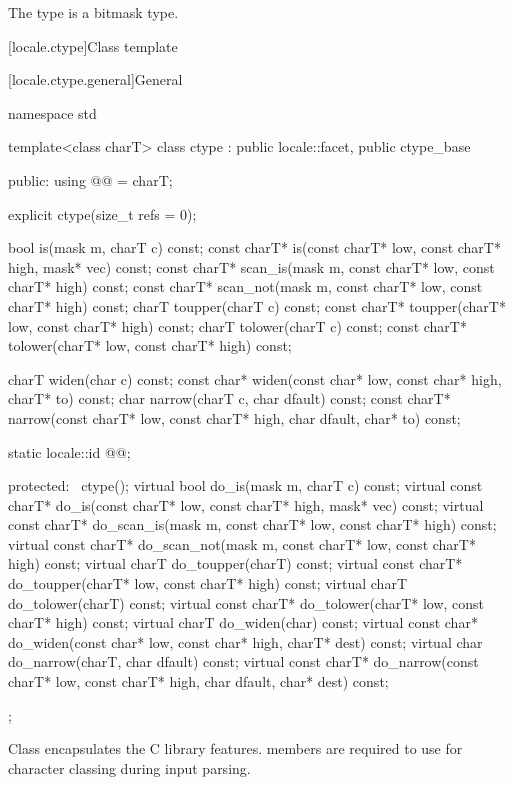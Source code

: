 \pnum
The type  is a bitmask type.

[locale.ctype]{Class template }

[locale.ctype.general]{General}

%
\begin{codeblock}
namespace std {
  template<class charT>
  class ctype : public locale::facet, public ctype_base {
  public:
    using @@ = charT;

    explicit ctype(size_t refs = 0);

    bool         is(mask m, charT c) const;
    const charT* is(const charT* low, const charT* high, mask* vec) const;
    const charT* scan_is(mask m, const charT* low, const charT* high) const;
    const charT* scan_not(mask m, const charT* low, const charT* high) const;
    charT        toupper(charT c) const;
    const charT* toupper(charT* low, const charT* high) const;
    charT        tolower(charT c) const;
    const charT* tolower(charT* low, const charT* high) const;

    charT        widen(char c) const;
    const char*  widen(const char* low, const char* high, charT* to) const;
    char         narrow(charT c, char dfault) const;
    const charT* narrow(const charT* low, const charT* high, char dfault, char* to) const;

    static locale::id @@;

  protected:
    ~ctype();
    virtual bool         do_is(mask m, charT c) const;
    virtual const charT* do_is(const charT* low, const charT* high, mask* vec) const;
    virtual const charT* do_scan_is(mask m, const charT* low, const charT* high) const;
    virtual const charT* do_scan_not(mask m, const charT* low, const charT* high) const;
    virtual charT        do_toupper(charT) const;
    virtual const charT* do_toupper(charT* low, const charT* high) const;
    virtual charT        do_tolower(charT) const;
    virtual const charT* do_tolower(charT* low, const charT* high) const;
    virtual charT        do_widen(char) const;
    virtual const char*  do_widen(const char* low, const char* high, charT* dest) const;
    virtual char         do_narrow(charT, char dfault) const;
    virtual const charT* do_narrow(const charT* low, const charT* high,
                                   char dfault, char* dest) const;
  };
}
\end{codeblock}

\pnum
Class  encapsulates the C library  features.
 members are required to use 
for character classing during input parsing.

